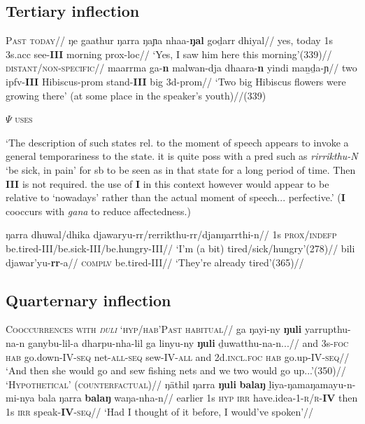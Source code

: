 \documentclass[12pt]{article}
\begin{document}
\subsection{Tertiary inflection}
\pex\textsc{Past}
\a{}\begingl\glpreamble\textsc{today}//
\gla ŋe gaathur ŋarra ŋaɲa nhaa-\textbf{ŋal} goḏarr dhiyal//
\glb	yes, today 1s 3s{\sc.acc} see-\textbf{III} morning {\sc prox-loc}//
\glft`Yes, I saw him here this morning'\hfill(339)//\endgl
\a{}\begingl\glpreamble\textsc{distant/non-specific}//
\gla maarrma ga-\textbf{n} malwan-dja dhaara-\textbf{n} yindi maṉḏa-ɲ//
\glb two {\sc ipfv-\textbf{III}} Hibiscus-{\sc prom} stand-\textbf{III} big 3d-{\sc prom}//
\glft`Two big Hibiscus flowers were growing there' (at some place in the speaker's youth)//\hfill(339)
\endgl\xe


\pex\textsc{$\Psi$ uses}


`The description of such states rel. to the moment of speech appears to invoke a general temporariness to the state. it is quite poss with a pred such as \textit{rirrikthu-N} `be sick, in pain' for sb to be seen as in that state for a long period of time. Then \textbf{III} is not required. the use of\textbf{ I} in this context however would appear to be relative to `nowadays' rather than the actual moment of speech... perfective.' (\textbf{I}  cooccurs with \textit{gana} to reduce affectedness.)

\a\begingl\gla ŋarra dhuwal/dhika djawaryu-rr/rerrikthu-rr/djanŋarrthi-n//
\glb 1s \textsc{prox/indefp} be.tired-III/be.sick-III/be.hungry-III//
\glft`I'm (a bit) tired/sick/hungry'\hfill(278)//\endgl
\a\begingl\gla bili djawar'yu-\textbf{rr}-a//
\glb \textsc{complv} be.tired-III//
\glft`They're already tired'\hfill(365)//\endgl
\xe
\subsection{Quarternary inflection}
\pex{}\textsc{Cooccurrences with \textit{ŋuli} `hyp/hab'}\a\begingl\glpreamble\textsc{Past habitual}//
\gla ga ŋayi-ny \textbf{ŋuli} yarrupthu-na-n ganybu-lil-a dharpu-nha-lil ga linyu-ny \textbf{ŋuli} ḏuwatthu-na-n...//
\glb  and 3s-\textsc{foc} \textsc{hab} go.down-IV-\textsc{seq} net\textsc{-all-seq} sew-IV\textsc{-all} and 2d\textsc{.incl.foc} \textsc{hab} go.up-IV\textsc{-seq}//
\glft`And then she  would go and sew fishing nets and we two  would go up...'\hfill(350)//
\endgl
\a{}\begingl\glpreamble\textsc{`Hypothetical' (counterfactual)}//
\gla ŋäthil ŋarra \textbf{ŋuli} \textbf{balaŋ} ḻiya-ŋamaŋamayu-n-mi-nya bala ŋarra \textbf{balaŋ} waŋa-nha-n//
\glb earlier 1s \textsc{hyp} \textsc{irr} have.idea-1-\textsc{r/r}-\textbf{IV} then 1s \textsc{irr} speak-\textbf{IV}-\textsc{seq}//
\glft`Had I thought of it before, I would've spoken'//
\endgl\xe
\end{document}
